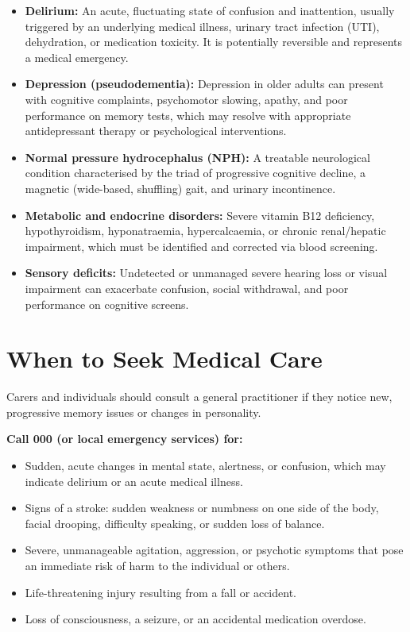 \begin{itemize}
    \item \textbf{Delirium:} An acute, fluctuating state of confusion and inattention, usually triggered by an underlying medical illness, urinary tract infection (UTI), dehydration, or medication toxicity. It is potentially reversible and represents a medical emergency.
    \item \textbf{Depression (pseudodementia):} Depression in older adults can present with cognitive complaints, psychomotor slowing, apathy, and poor performance on memory tests, which may resolve with appropriate antidepressant therapy or psychological interventions.
    \item \textbf{Normal pressure hydrocephalus (NPH):} A treatable neurological condition characterised by the triad of progressive cognitive decline, a magnetic (wide-based, shuffling) gait, and urinary incontinence.
    \item \textbf{Metabolic and endocrine disorders:} Severe vitamin B12 deficiency, hypothyroidism, hyponatraemia, hypercalcaemia, or chronic renal/hepatic impairment, which must be identified and corrected via blood screening.
    \item \textbf{Sensory deficits:} Undetected or unmanaged severe hearing loss or visual impairment can exacerbate confusion, social withdrawal, and poor performance on cognitive screens.
\end{itemize}

\section*{When to Seek Medical Care}
Carers and individuals should consult a general practitioner if they notice new, progressive memory issues or changes in personality.

\textbf{Call 000 (or local emergency services) for:}
\begin{itemize}
    \item Sudden, acute changes in mental state, alertness, or confusion, which may indicate delirium or an acute medical illness.
    \item Signs of a stroke: sudden weakness or numbness on one side of the body, facial drooping, difficulty speaking, or sudden loss of balance.
    \item Severe, unmanageable agitation, aggression, or psychotic symptoms that pose an immediate risk of harm to the individual or others.
    \item Life-threatening injury resulting from a fall or accident.
    \item Loss of consciousness, a seizure, or an accidental medication overdose.
\end{itemize}

